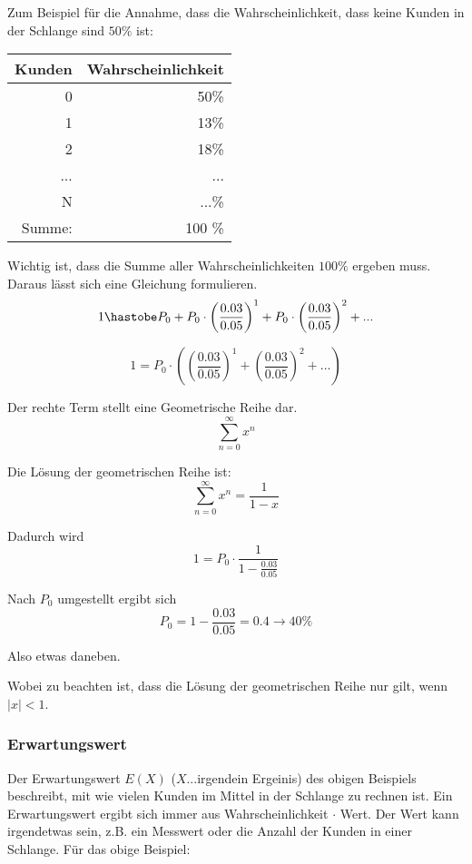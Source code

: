 \documentclass[11pt, a4paper]{article}
\begin{document}
Zum Beispiel für die Annahme, dass die Wahrscheinlichkeit, dass keine Kunden in der Schlange sind $50 \si{\percent}$ ist:
\begin{table}[H]
  \begin{center}
  \begin{tabular}{rr}
    Kunden &Wahrscheinlichkeit\\
    \hline
    0&50\si{\percent}\\
    1&13\si{\percent}\\
    2&18\si{\percent}\\
    ...&...\\
    N&...\si{\percent}\\
    \hline
    Summe: &100 \si{\percent}
  \end{tabular}
  \end{center}
\end{table}

Wichtig ist, dass die Summe aller Wahrscheinlichkeiten $100\si{\percent}$ ergeben muss. Daraus lässt sich eine Gleichung formulieren.
\[1 \hastobe P_{0} + P_{0} \cdot \left(\frac{0.03}{0.05}\right)^{1} + P_{0} \cdot\left( \frac{0.03}{0.05}\right)^{2} + ...\]

\[1 = P_{0} \cdot \left( \left(\frac{0.03}{0.05}\right)^{1} + \left( \frac{0.03}{0.05}\right)^{2} + ...\right)\]

Der rechte Term stellt eine Geometrische Reihe dar.
\[\sum_{n=0}^{\infty}{x^{n}}\]

Die Lösung der geometrischen Reihe ist:
\[\sum_{n=0}^{\infty}{x^{n}} = \frac{1}{1-x}\]

Dadurch wird
\[1 = P_{0} \cdot \frac{1}{1-\frac{0.03}{0.05}}\]

Nach $P_{0}$ umgestellt ergibt sich
\[P_{0} = 1- \frac{0.03}{0.05} = 0.4 \rightarrow 40 \si{\percent}\]

Also etwas daneben.

Wobei zu beachten ist, dass die Lösung der geometrischen Reihe nur gilt, wenn $|x| < 1$.

\subsubsection{Erwartungswert}
Der Erwartungswert $E(X)$ ($X$...irgendein Ergeinis) des obigen Beispiels beschreibt, mit wie vielen Kunden im Mittel in der Schlange zu rechnen ist. Ein Erwartungswert ergibt sich immer aus \glqq Wahrscheinlichkeit $\cdot$ Wert\grqq{}. Der Wert kann irgendetwas sein, z.B. ein Messwert oder die Anzahl der Kunden in einer Schlange. Für das obige Beispiel:
\end{document}
